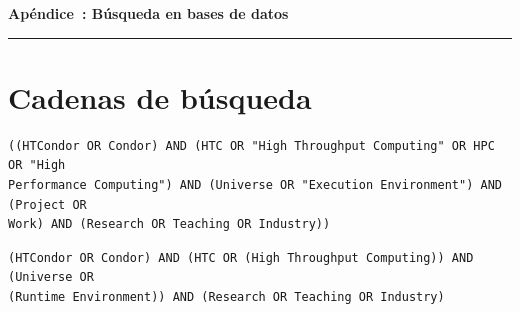 

{}


\vspace{40pt}

{\centering \normalfont\huge\bfseries Apéndice~\thechapter: Búsqueda en bases de datos~\par}

\vspace{10pt}

{\centering \rule{\textwidth}{0.4pt} \par}

\vspace{40pt}




\FloatBarrier\section{Cadenas de búsqueda}\label{sec:cadenas-busqueda}


\begin{tcolorbox}[
		colback=gray!5,
		colframe=black!60,
		title=Cadena de búsqueda en ACM Full Text Collection,
		fonttitle=\bfseries,
		sharp corners=south
	]
	\scriptsize
	\begin{verbatim}
((HTCondor OR Condor) AND (HTC OR "High Throughput Computing" OR HPC OR "High
Performance Computing") AND (Universe OR "Execution Environment") AND (Project OR
Work) AND (Research OR Teaching OR Industry))
	\end{verbatim}
\end{tcolorbox}

\begin{tcolorbox}[
		colback=gray!5,
		colframe=black!60,
		title=Cadena de búsqueda en IEEE Xplore,
		fonttitle=\bfseries,
		sharp corners=south
	]
	\scriptsize
	\begin{verbatim}
(HTCondor OR Condor) AND (HTC OR (High Throughput Computing)) AND (Universe OR
(Runtime Environment)) AND (Research OR Teaching OR Industry)
	\end{verbatim}
\end{tcolorbox}

